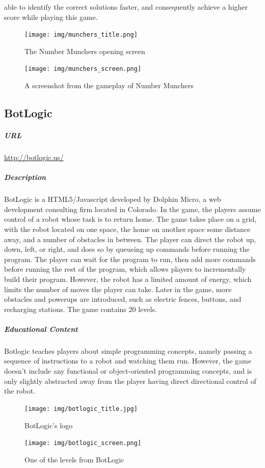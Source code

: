 able to identify the correct solutions faster, and consequently achieve a higher score while playing this game.\begin{figure}[h!]\centering \texttt{[image: img/munchers\_title.png]}\caption{The Number Munchers opening screen}\end{figure}\begin{figure}[h!]\centering \texttt{[image: img/munchers\_screen.png]}\caption{A screenshot from the gameplay of Number Munchers}\end{figure}\newpage\subsection{BotLogic}\subparagraph{URL}\url{http://botlogic.us/}\subparagraph{Description}BotLogic is a HTML5/Javascript developed by Dolphin Micro, a web development consulting firm located in Colorado. In the game, the players assume control of a robot whose task is to return home. The game takes place on a grid, with the robot located on one space, the home on another space some distance away, and a number of obstacles in between. The player can direct the robot up, down, left, or right, and does so by queueing up commands before running the program. The player can wait for the program to run, then add more commands before running the rest of the program, which allows players to incrementally build their program. However, the robot has a limited amount of energy, which limits the number of moves the player can take. Later in the game, more obstacles and powerups are introduced, such as electric fences, buttons, and recharging stations. The game contains 20 levels.\subparagraph{Educational Content}Botlogic teaches players about simple programming concepts, namely passing a sequence of instructions to a robot and watching them run. However, the game doesn't include any functional or object-oriented programming concepts, and is only slightly abstracted away from the player having direct directional control of the robot.\begin{figure}[h!]\centering \texttt{[image: img/botlogic\_title.jpg]}\caption{BotLogic's logo}\end{figure}\begin{figure}[h!]\centering \texttt{[image: img/botlogic\_screen.png]}\caption{One of the levels from BotLogic}\end{figure}